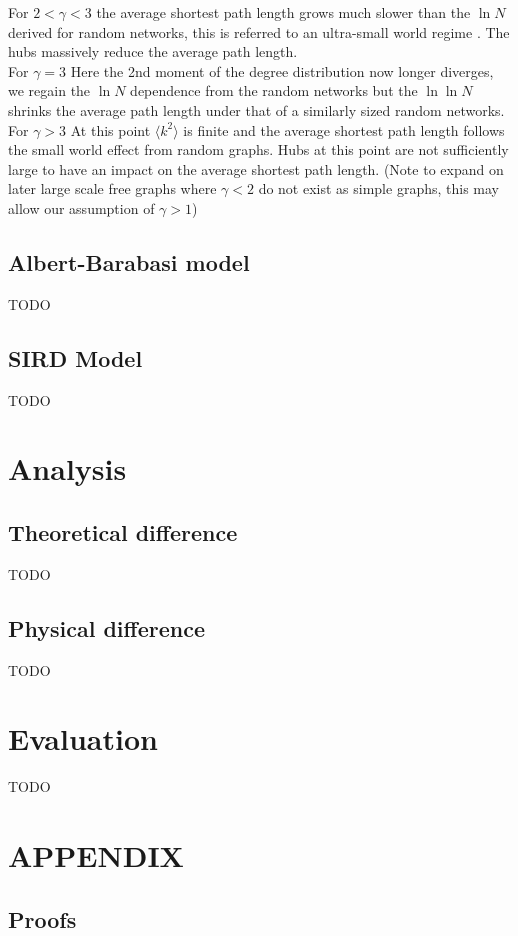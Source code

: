 \documentclass{article}
\begin{document}
        For $2<\gamma<3$ the average shortest path length grows much slower than the $\ln N$ derived for random networks, this is referred to an ultra-small world regime \parencite{cohen2003scale}. The hubs massively reduce the average path length.\\
        For $\gamma =3$ Here the 2nd moment of the degree distribution now longer diverges, we regain the $\ln N$ dependence from the random networks but the $\ln\ln N$ shrinks the average path length under that of a similarly sized random networks.\\
        For $\gamma > 3$ At this point $\langle k^2 \rangle$ is finite and the average shortest path length follows the small world effect from random graphs. Hubs at this point are not sufficiently large to have an impact on the average shortest path length.
        (Note to expand on later large scale free graphs where $\gamma < 2$ do not exist as simple graphs, this may allow our assumption of $\gamma >1$)
        \subsection{Albert-Barabasi model}
        TODO
        \subsection{SIRD Model}
        TODO
    \section{Analysis}
        \subsection{Theoretical difference}
        TODO
        \subsection{Physical difference}
        TODO
        
        
    \section{Evaluation}
    TODO
    \section{APPENDIX}
        \subsection{Proofs}
\end{document}
